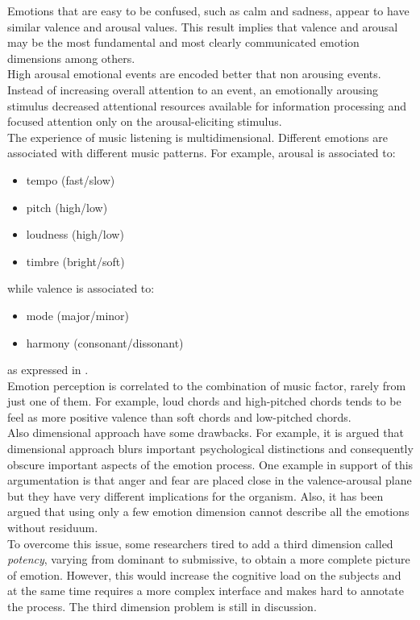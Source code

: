 Emotions that are easy to be confused, such as calm and sadness, appear to have similar valence and arousal values. This result implies that valence and arousal may be the most fundamental and most clearly communicated emotion dimensions among others.
\\
High arousal emotional events are encoded better that non arousing events. Instead of increasing overall attention to an event, an emotionally arousing stimulus decreased attentional resources available for information processing and focused attention only on the arousal-eliciting stimulus.
\\ \indent
The experience of music listening is multidimensional. Different emotions are associated with different music patterns. For example, arousal is associated to:
\begin{itemize}
	\item tempo (fast/slow)
	\item pitch (high/low)
	\item loudness (high/low)
	\item timbre (bright/soft)
\end{itemize}
while valence is associated to:
\begin{itemize}
	\item mode (major/minor)
	\item harmony (consonant/dissonant)
\end{itemize}
as expressed in \cite{gabrielsson2001influence}.
\\
Emotion perception is correlated to the combination of music factor, rarely from just one of them. For example, loud chords and high-pitched chords tends to be feel as more positive valence than soft chords and low-pitched chords.
\\ \indent
Also dimensional approach have some drawbacks. For example, it is argued that dimensional approach blurs important psychological distinctions and consequently obscure important aspects of the emotion process. One example in support of this argumentation is that anger and fear are placed close in the valence-arousal plane but they have very different implications for the organism. Also, it has been argued that using only a few emotion dimension cannot describe all the emotions without residuum.
\\
To overcome this issue, some researchers tired to add a third dimension called \textit{potency}, varying from dominant to submissive, to obtain a more complete picture of emotion. However, this would increase the cognitive load on the subjects and at the same time requires a more complex interface and makes hard to annotate the process. The third dimension problem is still in discussion.

